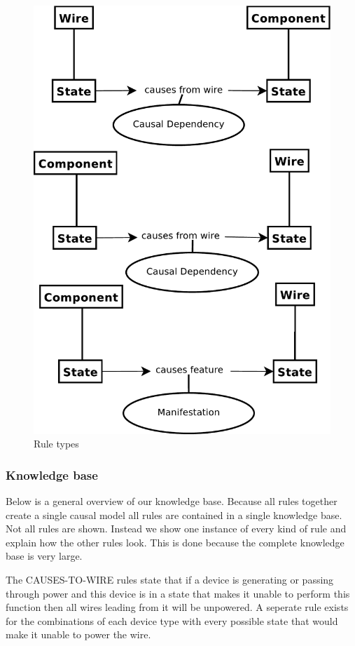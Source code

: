 \documentclass[a4paper,10pt]{article}
\begin{document}
\begin{figure}[htbp]
	\centering
		\includegraphics[width=1.00\textwidth]{rule-types.pdf}
	\caption{Rule types}
	\label{fig:IS}
\end{figure}

\subsubsection{Knowledge base}
Below is a general overview of our knowledge base. Because all rules together create a single causal model all rules are contained in a single knowledge base. Not all rules are shown. Instead we show one instance of every kind of rule and explain how the other rules look. This is done because the complete knowledge base is very large.

The CAUSES-TO-WIRE rules state that if a device is generating or passing through power and this device is in a state that makes it unable to perform this function then all wires leading from it will be unpowered. A seperate rule exists for the combinations of each device type with every possible state that would make it unable to power the wire.
\end{document}

